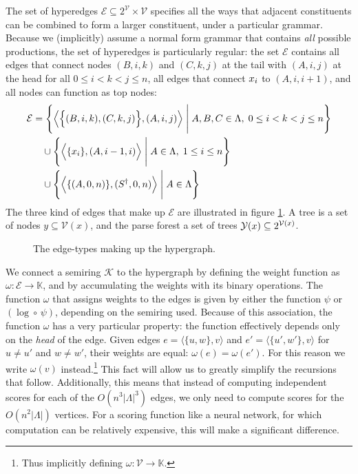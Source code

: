   The set of hyperedges $\mathcal{E} \subseteq 2^{\mathcal{V}} \times \mathcal{V}$ specifies all the ways that adjacent constituents can be combined to form a larger constituent, under a particular grammar. Because we (implicitly) assume a normal form grammar that contains \textit{all} possible productions, the set of hyperedges is particularly regular: the set $\mathcal{E}$ contains all edges that connect nodes $(B, i, k)$ and $(C, k, j)$ at the tail with $(A, i, j)$ at the head for all $0 \leq i < k < j \leq n$, all edges that connect $\x_i$ to $(A, i, i+1)$, and all nodes can function as top nodes:
  \begin{align*}
    \mathcal{E}
      &= \Bigg\{ \Big\langle \Big\{ (B, i, k), (C, k, j) \Big\},  (A, i, j) \Big\rangle \; \Bigg\vert \; A, B, C \in \Lambda, \; 0 \leq i < k < j \leq n \Bigg\}  \\
      &\quad\cup \Bigg\{ \Big\langle \{ \x_i \}, (A, i-1, i) \Big\rangle \; \Bigg\vert \; A \in \Lambda, \; 1 \leq i \leq n \Bigg\}  \\
      &\quad\cup \Bigg\{ \Big\langle \{ (A, 0, n) \}, (S^{\dagger}, 0, n) \Big\rangle \; \Bigg\vert \; A \in \Lambda \Bigg\}
  \end{align*}
  The three kind of edges that make up $\mathcal{E}$ are illustrated in figure \ref{fig:crf-edges}. A tree is a set of nodes $y \subseteq \mathcal{V}(x)$, and the parse forest a set of trees $\yieldx \subseteq 2^{\mathcal{V}(x)}$.

  \begin{figure}[h]
  \label{fig:crf-edges}
    \center
    \begin{tikzpicture}[scale=.6]
      
    \end{tikzpicture}
    \caption{The edge-types making up the hypergraph.}
  \end{figure}

  We connect a semiring $\mathcal{K}$ to the hypergraph by defining the weight function as $\omega: \mathcal{E} \to \mathbb{K}$, and by accumulating the weights with its binary operations. The function $\omega$ that assigns weights to the edges is given by either the function $\psi$ or $(\log \circ \, \psi)$, depending on the semiring used. Because of this association, the function $\omega$ has a very particular property: the function effectively depends only on the \textit{head} of the edge. Given edges $e = \langle \{ u, w \}, v \rangle$ and $e' =  \langle \{ u', w' \}, v \rangle$ for $u \neq u'$ and $w \neq w'$, their weights are equal: $\omega(e) = \omega(e')$. For this reason we write $\omega(v)$ instead.\footnote{Thus implicitly defining $\omega: \mathcal{V} \to \mathbb{K}$.} This fact will allow us to greatly simplify the recursions that follow. Additionally, this means that instead of computing independent scores for each of the $O(n^3 \vert\Lambda\rvert^3)$ edges, we only need to compute scores for the $O(n^2 \vert\Lambda\rvert)$ vertices. For a scoring function like a neural network, for which computation can be relatively expensive, this will make a significant difference.

